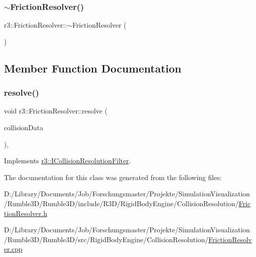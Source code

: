 \subsubsection{\texorpdfstring{$\sim$\+Friction\+Resolver()}{~FrictionResolver()}}
{\footnotesize\ttfamily r3\+::\+Friction\+Resolver\+::$\sim$\+Friction\+Resolver (\begin{DoxyParamCaption}{ }\end{DoxyParamCaption})\hspace{0.3cm}{\ttfamily [default]}}



\subsection{Member Function Documentation}
\mbox{\label{classr3_1_1_friction_resolver_aa6c4e02ba5ec9759eea10900cdcf44f5}} 
\subsubsection{\texorpdfstring{resolve()}{resolve()}}
{\footnotesize\ttfamily void r3\+::\+Friction\+Resolver\+::resolve (\begin{DoxyParamCaption}\item[{const \mbox{\hyperlink{classr3_1_1_collision_data}{Collision\+Data}} \&}]{collision\+Data }\end{DoxyParamCaption})\hspace{0.3cm}{\ttfamily [override]}, {\ttfamily [virtual]}}



Implements \mbox{\hyperlink{classr3_1_1_i_collision_resolution_filter_a9ae35c07c585500c409459ef87e5ae15}{r3\+::\+I\+Collision\+Resolution\+Filter}}.



The documentation for this class was generated from the following files\+:\begin{DoxyCompactItemize}
\item 
D\+:/\+Library/\+Documents/\+Job/\+Forschungsmaster/\+Projekte/\+Simulation\+Visualization/\+Rumble3\+D/\+Rumble3\+D/include/\+R3\+D/\+Rigid\+Body\+Engine/\+Collision\+Resolution/\mbox{\hyperlink{_friction_resolver_8h}{Friction\+Resolver.\+h}}\item 
D\+:/\+Library/\+Documents/\+Job/\+Forschungsmaster/\+Projekte/\+Simulation\+Visualization/\+Rumble3\+D/\+Rumble3\+D/src/\+Rigid\+Body\+Engine/\+Collision\+Resolution/\mbox{\hyperlink{_friction_resolver_8cpp}{Friction\+Resolver.\+cpp}}\end{DoxyCompactItemize}
